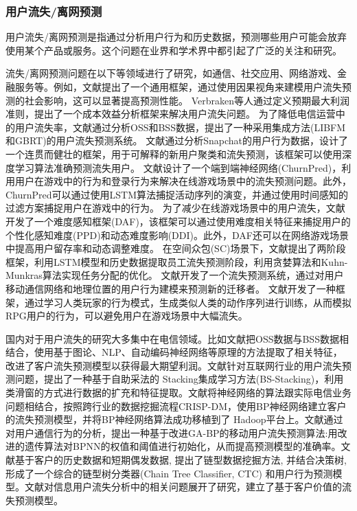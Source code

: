 \subsubsection{用户流失/离网预测}
用户流失/离网预测是指通过分析用户行为和历史数据，预测哪些用户可能会放弃使用某个产品或服务。这个问题在业界和学术界中都引起了广泛的关注和研究。\par
流失/离网预测问题在以下等领域进行了研究，如通信、社交应用、网络游戏、金融服务等。例如，文献\cite{zhang2022counterfactual}提出了一个通用框架，通过使用因果视角来建模用户流失预测的社会影响，这可以显著提高预测性能。
Verbraken等人\cite{verbraken2012novel}通过定义预期最大利润准则，提出了一个成本效益分析框架来解决用户流失问题。
为了降低电信运营中的用户流失率，文献\cite{liu2017deriving}通过分析OSS和BSS数据，提出了一种采用集成方法(LIBFM和GBRT)的用户流失预测系统。
文献\cite{yang2018know}通过分析Snapchat的用户行为数据，设计了一个连贯而健壮的框架，用于可解释的新用户聚类和流失预测，该框架可以使用深度学习算法准确预测流失用户。
文献\cite{zheng2020keep}设计了一个端到端神经网络(ChurnPred)，利用用户在游戏中的行为和登录行为来解决在线游戏场景中的流失预测问题。此外，ChurnPred可以通过使用LSTM算法捕捉活动序列的演变，并通过使用时间感知的过滤方案捕捉用户在游戏中的行为。
为了减少在线游戏场景中的用户流失，文献\cite{li2021difficulty}开发了一个难度感知框架(DAF)，该框架可以通过使用难度相关特征来捕捉用户的个性化感知难度(PPD)和动态难度影响(DDI)。此外，DAF还可以在网络游戏场景中提高用户留存率和动态调整难度。
在空间众包(SC)场景下，文献\cite{wang2021task}提出了两阶段框架，利用LSTM模型和历史数据提取员工流失预测阶段，利用贪婪算法和Kuhn-Munkras算法实现任务分配的优化。
文献\cite{yang2018stay}开发了一个流失预测系统，通过对用户移动通信网络和地理位置的用户行为建模来预测新的迁移者。
文献\cite{zhao2021player}开发了一种框架，通过学习人类玩家的行为模式，生成类似人类的动作序列进行训练，从而模拟RPG用户的行为，可以避免用户在游戏场景中大幅流失。\par
国内对于用户流失的研究大多集中在电信领域。比如文献\cite{徐树乔2019基于}把OSS数据与BSS数据相结合，使用基于图论、NLP、自动编码神经网络等原理的方法提取了相关特征，改进了客户流失预测模型以获得最大期望利润。文献\cite{郑红2020基于}针对互联网行业的用户流失预测问题，提出了一种基于自助采法的 Stacking集成学习方法(BS-Stacking)，利用类滑窗的方式进行数据的扩充和特征提取。文献\cite{孙碧颖2016基于神经网络算法}将神经网络的算法跟实际电信业务问题相结合，按照跨行业的数据挖掘流程CRISP-DM，使用BP神经网络建立客户的流失预测模型，并将BP神经网络算法成功移植到了 Hadoop平台上。文献\cite{于瑞云2019基于改进}通过对用户通信行为的分析，提出一种基于改进GA-BP的移动用户流失预测算法:用改进的遗传算法对BPNN的权值和阈值进行初始化，从而提高预测模型的准确率。文献\cite{刘光远2007数据挖掘方法在用户流失预测分析中的应用}基于客户的历史数据和短期偶发数据, 提出了链型数据挖掘方法, 并结合决策树, 形成了一个综合的链型树分类器(Chain Tree Classifier, CTC) 和用户行为预测模型。文献\cite{赖院根2011基于客户价值的信息用户流失预测研究}对信息用户流失分析中的相关问题展开了研究，建立了基于客户价值的流失预测模型。

